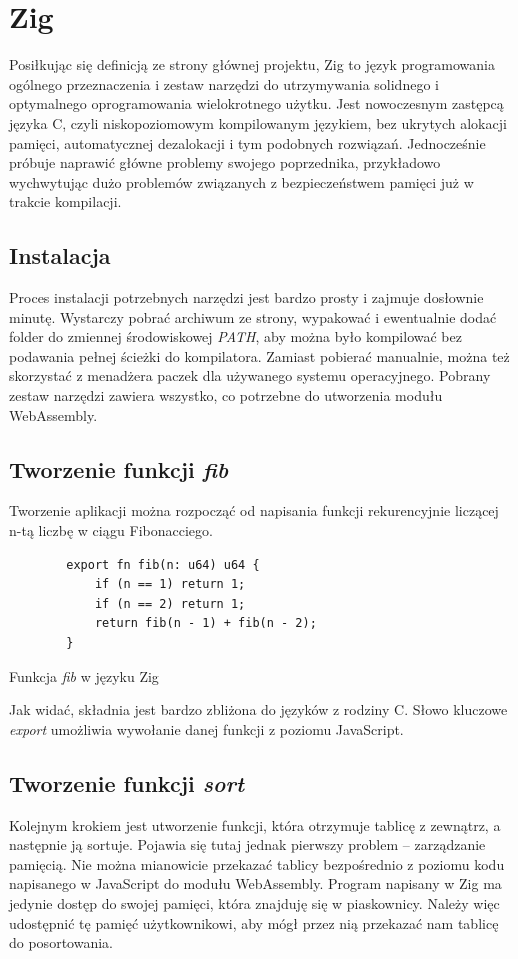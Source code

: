 \documentclass[language=polish,type=master]{aghmodern}
\begin{document}
\section{Zig}
Posiłkując się definicją ze strony głównej projektu\footnotemark{}, Zig to język programowania ogólnego przeznaczenia i zestaw narzędzi do utrzymywania solidnego i optymalnego oprogramowania wielokrotnego użytku.
Jest nowoczesnym zastępcą języka C, czyli niskopoziomowym kompilowanym językiem, bez ukrytych alokacji pamięci, automatycznej dezalokacji i tym podobnych rozwiązań.
Jednocześnie próbuje naprawić główne problemy swojego poprzednika, przykładowo wychwytując dużo problemów związanych z bezpieczeństwem pamięci już w trakcie kompilacji.

\subsection{Instalacja}
Proces instalacji potrzebnych narzędzi jest bardzo prosty i zajmuje dosłownie minutę.
Wystarczy pobrać archiwum ze strony, wypakować i ewentualnie dodać folder do zmiennej środowiskowej \emph{PATH}, aby można było kompilować bez podawania pełnej ścieżki do kompilatora.
Zamiast pobierać manualnie, można też skorzystać z menadżera paczek dla używanego systemu operacyjnego.
Pobrany zestaw narzędzi zawiera wszystko, co potrzebne do utworzenia modułu WebAssembly.

\subsection{Tworzenie funkcji \emph{fib}}
Tworzenie aplikacji można rozpocząć od napisania funkcji rekurencyjnie liczącej n-tą liczbę w ciągu Fibonacciego.

\begin{listing}[H]
    \begin{verbatim}
        export fn fib(n: u64) u64 {
            if (n == 1) return 1;
            if (n == 2) return 1;
            return fib(n - 1) + fib(n - 2);
        }
    \end{verbatim}
    \caption{Funkcja \emph{fib} w języku Zig}
\end{listing}

Jak widać, składnia jest bardzo zbliżona do języków z rodziny C.
Słowo kluczowe \emph{export} umożliwia wywołanie danej funkcji z poziomu JavaScript.

\subsection{Tworzenie funkcji \emph{sort}}
Kolejnym krokiem jest utworzenie funkcji, która otrzymuje tablicę z zewnątrz, a następnie ją sortuje.
Pojawia się tutaj jednak pierwszy problem -- zarządzanie pamięcią.
Nie można mianowicie przekazać tablicy bezpośrednio z poziomu kodu napisanego w JavaScript do modułu WebAssembly.
Program napisany w Zig ma jedynie dostęp do swojej pamięci, która znajduję się w piaskownicy.
Należy więc udostępnić tę pamięć użytkownikowi, aby mógł przez nią przekazać nam tablicę do posortowania.
\end{document}
